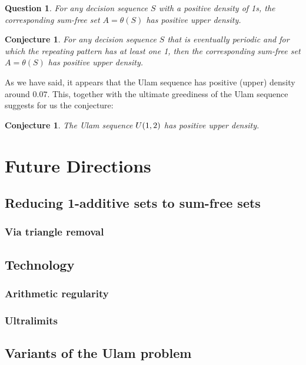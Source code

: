 \documentclass{article}
\newtheorem{conjecture}[theorem]{Conjecture}
\newtheorem{question}[theorem]{Question}
\theoremstyle{definition}
\theoremstyle{remark}
\numberwithin{equation}{section}
\begin{document}
{\begin{question}
  For any decision sequence $S$ with a positive density of 1s, the
  corresponding sum-free set $A = \theta(S)$ has positive upper density.
\end{question}

\begin{conjecture}
  For any decision sequence $S$ that is eventually periodic and for
  which the repeating pattern has at least one 1, then the
  corresponding sum-free set $A = \theta(S)$ has positive upper
  density.
\end{conjecture}

As we have said, it appears that the Ulam sequence has positive
(upper) density around $0.07$.  This, together with the ultimate
greediness of the Ulam sequence suggests for us the conjecture:

\begin{conjecture}
  The Ulam sequence $U(1,2)$ has positive upper density.
\end{conjecture}

\section{Future Directions}

\subsection{Reducing 1-additive sets to sum-free sets}

\subsubsection{Via triangle removal}

\subsection{Technology}

\subsubsection{Arithmetic regularity}

\subsubsection{Ultralimits}

\subsection{Variants of the Ulam problem}
}
\end{document}
